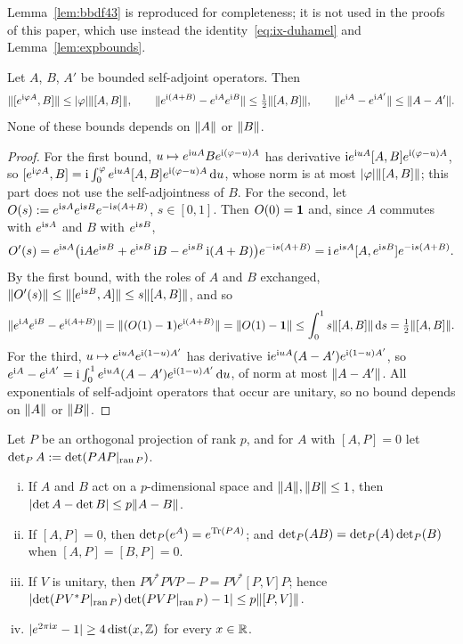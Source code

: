Lemma~\ref{lem:bbdf43} is reproduced for completeness; it is not used in the proofs of this paper, which use instead
the identity~\eqref{eq:ix-duhamel} and Lemma~\ref{lem:expbounds}.

\begin{lemma}\label{lem:expbounds}
Let $A$, $B$, $A'$ be bounded self-adjoint operators. Then
\[
\lVert[e^{\mathrm{i}\varphi A},B]\rVert\le\lvert\varphi\rvert\lVert[A,B]\rVert,\qquad\lVert e^{\mathrm{i}(A+B)}-e^{\mathrm{i} A}e^{\mathrm{i} B}\rVert\le\tfrac12\lVert[A,B]\rVert,\qquad
\lVert e^{\mathrm{i} A}-e^{\mathrm{i} A'}\rVert\le\lVert A-A'\rVert .
\]
None of these bounds depends on $\lVert A\rVert$ or $\lVert B\rVert$.
\end{lemma}

\begin{proof}
For the first bound, $u\mapsto e^{\mathrm{i} uA}Be^{\mathrm{i}(\varphi-u)A}$ has derivative $\mathrm{i} e^{\mathrm{i} uA}[A,B]e^{\mathrm{i}(\varphi-u)A}$, so
$[e^{\mathrm{i}\varphi A},B]=\mathrm{i}\int_0^\varphi e^{\mathrm{i} uA}[A,B]e^{\mathrm{i}(\varphi-u)A}\,\mathrm{d} u$, whose norm is at most $\lvert\varphi\rvert\lVert[A,B]\rVert$;
this part does not use the self-adjointness of $B$. For the second, let $O(s):=e^{\mathrm{i} sA}e^{\mathrm{i} sB}e^{-\mathrm{i} s(A+B)}$,
$s\in[0,1]$. Then $O(0)=\mathbf{1}$ and, since $A$ commutes with $e^{\mathrm{i} sA}$ and $B$ with $e^{\mathrm{i} sB}$,
\[
O'(s)=e^{\mathrm{i} sA}\bigl(\mathrm{i} Ae^{\mathrm{i} sB}+e^{\mathrm{i} sB}\,\mathrm{i} B-e^{\mathrm{i} sB}\,\mathrm{i}(A+B)\bigr)e^{-\mathrm{i} s(A+B)}
=\mathrm{i}\,e^{\mathrm{i} sA}[A,e^{\mathrm{i} sB}]e^{-\mathrm{i} s(A+B)} .
\]
By the first bound, with the roles of $A$ and $B$ exchanged, $\lVert O'(s)\rVert\le\lVert[e^{\mathrm{i} sB},A]\rVert\le s\lVert[A,B]\rVert$, and so
\[
\lVert e^{\mathrm{i} A}e^{\mathrm{i} B}-e^{\mathrm{i}(A+B)}\rVert=\lVert(O(1)-\mathbf{1})e^{\mathrm{i}(A+B)}\rVert=\lVert O(1)-\mathbf{1}\rVert\le\int_0^1s\lVert[A,B]\rVert\,\mathrm{d} s=\tfrac12\lVert[A,B]\rVert .
\]
For the third, $u\mapsto e^{\mathrm{i} uA}e^{\mathrm{i}(1-u)A'}$ has derivative $\mathrm{i} e^{\mathrm{i} uA}(A-A')e^{\mathrm{i}(1-u)A'}$, so
$e^{\mathrm{i} A}-e^{\mathrm{i} A'}=\mathrm{i}\int_0^1e^{\mathrm{i} uA}(A-A')e^{\mathrm{i}(1-u)A'}\,\mathrm{d} u$, of norm at most $\lVert A-A'\rVert$. All exponentials of
self-adjoint operators that occur are unitary, so no bound depends on $\lVert A\rVert$ or $\lVert B\rVert$.
\end{proof}

\begin{lemma}\label{lem:det}
Let $P$ be an orthogonal projection of rank $p$, and for $A$ with $[A,P]=0$ let $\det\nolimits_{P} A:=\det(PAP|_{\operatorname{ran} P})$.
\begin{enumerate}[(i)]
\item If $A$ and $B$ act on a $p$-dimensional space and $\lVert A\rVert,\lVert B\rVert\le1$, then $\lvert\det A-\det B\rvert\le p\lVert A-B\rVert$.
\item If $[A,P]=0$, then $\det\nolimits_{P}(e^A)=e^{\operatorname{Tr}(PA)}$; and $\det\nolimits_{P}(AB)=\det\nolimits_{P}(A)\det\nolimits_{P}(B)$ when $[A,P]=[B,P]=0$.
\item If $V$ is unitary, then $PV^*PVP-P=PV^*[P,V]P$; hence $\lvert\det(PV^*P|_{\operatorname{ran} P})\det(PVP|_{\operatorname{ran} P})-1\rvert\le p\lVert[P,V]\rVert$.
\item $\lvert e^{2\pi\mathrm{i} x}-1\rvert\ge4\operatorname{dist}(x,\mathbb{Z})$ for every $x\in\mathbb{R}$.
\end{enumerate}
\end{lemma}

